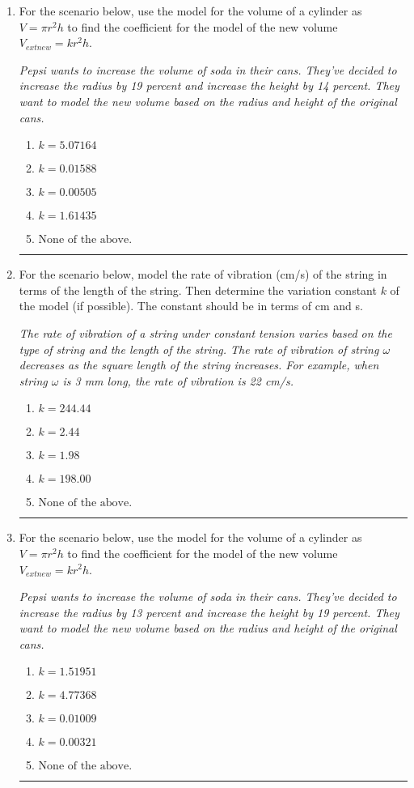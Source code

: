 \documentclass[14pt]{extbook}
\newcommand{\litem}[1]{\item#1\hspace*{-1cm}\rule{\textwidth}{0.4pt}}
\begin{document}
\begin{enumerate}
\litem{
For the scenario below, use the model for the volume of a cylinder as $V = \pi r^2 h$ to find the coefficient for the model of the new volume $V_{	ext{new}} = k r^2 h$.
\begin{center}
    \textit{ Pepsi wants to increase the volume of soda in their cans. They've decided to increase the radius by 19 percent and increase the height by 14 percent. They want to model the new volume based on the radius and height of the original cans. }
\end{center}
\begin{enumerate}[label=\Alph*.]
\item \( k = 5.07164 \)
\item \( k = 0.01588 \)
\item \( k = 0.00505 \)
\item \( k = 1.61435 \)
\item \( \text{None of the above.} \)

\end{enumerate} }
\litem{
For the scenario below, model the rate of vibration (cm/s) of the string in terms of the length of the string. Then determine the variation constant $k$ of the model (if possible). The constant should be in terms of cm and s.
\begin{center}
    \textit{ The rate of vibration of a string under constant tension varies based on the type of string and the length of the string. The rate of vibration of string $\omega$ decreases as the square length of the string increases. For example, when string $\omega$ is 3 mm long, the rate of vibration is 22 cm/s. }
\end{center}
\begin{enumerate}[label=\Alph*.]
\item \( k = 244.44 \)
\item \( k = 2.44 \)
\item \( k = 1.98 \)
\item \( k = 198.00 \)
\item \( \text{None of the above.} \)

\end{enumerate} }
\litem{
For the scenario below, use the model for the volume of a cylinder as $V = \pi r^2 h$ to find the coefficient for the model of the new volume $V_{	ext{new}} = k r^2 h$.
\begin{center}
    \textit{ Pepsi wants to increase the volume of soda in their cans. They've decided to increase the radius by 13 percent and increase the height by 19 percent. They want to model the new volume based on the radius and height of the original cans. }
\end{center}
\begin{enumerate}[label=\Alph*.]
\item \( k = 1.51951 \)
\item \( k = 4.77368 \)
\item \( k = 0.01009 \)
\item \( k = 0.00321 \)
\item \( \text{None of the above.} \)


\end{enumerate}}
\end{enumerate}
\end{document}
